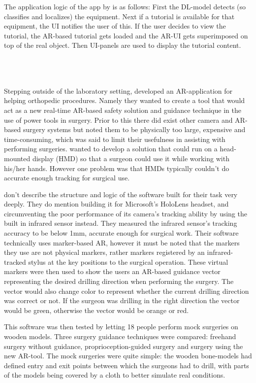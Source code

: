 	The application logic of the app by \textcite{estrada} is as follows: 
First the DL-model detects (so classifies and localizes) the equipment. Next 
if a tutorial is available for that equipment, the UI notifies the user of this.
If the user decides to view the tutorial, the AR-based tutorial gets loaded 
and the AR-UI gets superimposed on top of the real object. Then UI-panels are 
used to display the tutorial content. \par
\\
\\
\\
Stepping outside of the laboratory setting, \textcite{VanGestel2024} developed 
an AR-application for helping orthopedic procedures. Namely they wanted to 
create a tool that would act as a new real-time AR-based safety solution and 
guidance technique in the use of power tools in surgery. Prior to this there 
did exist other camera and AR-based surgery systems but 
\textcite{VanGestel2024} noted them to be physically too large, expensive and 
time-consuming, which was said to limit their usefulness in assisting with 
performing surgeries. \textcite{VanGestel2024} wanted to develop a solution 
that could run on a head-mounted display (HMD) so that a surgeon could use 
it while working with his/her hands. However one problem was that HMDs 
typically couldn't do accurate enough tracking for surgical 
use.\cite{VanGestel2024}\par
	\textcite{VanGestel2024} don't describe the structure and logic 
of the software built for their task very deeply. They do mention building it 
for Microsoft's HoloLens headset, and circumventing the poor performance of 
its camera's tracking ability by using the built in infrared sensor 
instead.\cite{VanGestel2024} They measured the infrared sensor's tracking 
accuracy to be below 1mm, accurate enough for surgical 
work.\cite{VanGestel2024} Their software technically uses marker-based AR, 
however it must be noted that the markers they use are not physical markers, 
rather markers registered by an infrared-tracked stylus at the key positions 
to the surgical operation.\cite{VanGestel2024} These virtual markers were then 
used to show the users an AR-based guidance vector representing the desired 
drilling direction when performing the surgery. The vector would also change 
color to represent whether the current drilling direction was correct or not. 
If the surgeon was drilling in the right direction the vector would be green, 
otherwise the vector would be orange or red.\cite{VanGestel2024}\par
	This software was then tested by letting 18 people perform mock 
surgeries on wooden models.\cite{VanGestel2024} Three surgery guidance 
techniques were compared: freehand surgery without guidance, 
proprioception-guided surgery and surgery using the new 
AR-tool.\cite{VanGestel2024} The mock surgeries were quite simple: the wooden 
bone-models had defined entry and exit points between which the surgeons had 
to drill, with parts of the models being covered by a cloth to better 
simulate real conditions.\cite{VanGestel2024}
